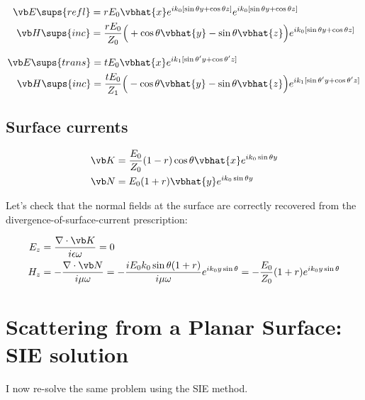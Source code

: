 \documentclass{article}
\begin{document}
\begin{align*}
\vb E\sups{refl} 
 &= rE_0 \vbhat{x} e^{ik_0[\sin\theta y + \cos\theta z]}
    e^{ik_0[\sin\theta y + \cos\theta z]} \\
\vb H\sups{inc} 
 &= \frac{rE_0}{Z_0} \Big( +\cos\theta\vbhat{y} - \sin\theta\vbhat{z}\Big)
    e^{ik_0[\sin\theta y + \cos\theta z]} \\
\end{align*}

\begin{align*}
\vb E\sups{trans} 
 &= tE_0 \vbhat{x} 
    e^{ik_1[\sin\theta^\prime y + \cos\theta^\prime z]} \\
\vb H\sups{inc} 
 &= \frac{tE_0}{Z_1} \Big( -\cos\theta\vbhat{y} - \sin\theta\vbhat{z}\Big)
    e^{ik_1[\sin\theta^\prime y + \cos\theta^\prime z]} \\
\end{align*}

\subsection*{Surface currents}

\begin{align*}
  \vb K &= \frac{E_0}{Z_0} (1-r)\cos\theta \vbhat{x} e^{ik_0 \sin \theta y}
\\
  \vb N &= E_0 (1+r) \vbhat{y} e^{ik_0 \sin \theta y}
\end{align*}

Let's check that the normal fields at the surface are 
correctly recovered from the divergence-of-surface-current 
prescription:

\begin{align*}
  E_z &= \frac{\nabla \cdot \vb K}{i\epsilon\omega} = 0
\\
  H_z & = -\frac{\nabla \cdot \vb N}{i\mu\omega} 
        = -\frac{i E_0 k_0 \sin\theta(1+r)}{i\mu\omega} e^{ik_0 y\sin\theta}
        = -\frac{E_0}{Z_0}(1+r) e^{ik_0 y \sin\theta}
\end{align*}


\newpage
\section{Scattering from a Planar Surface: SIE solution}

I now re-solve the same problem using the SIE method.
\end{document}

